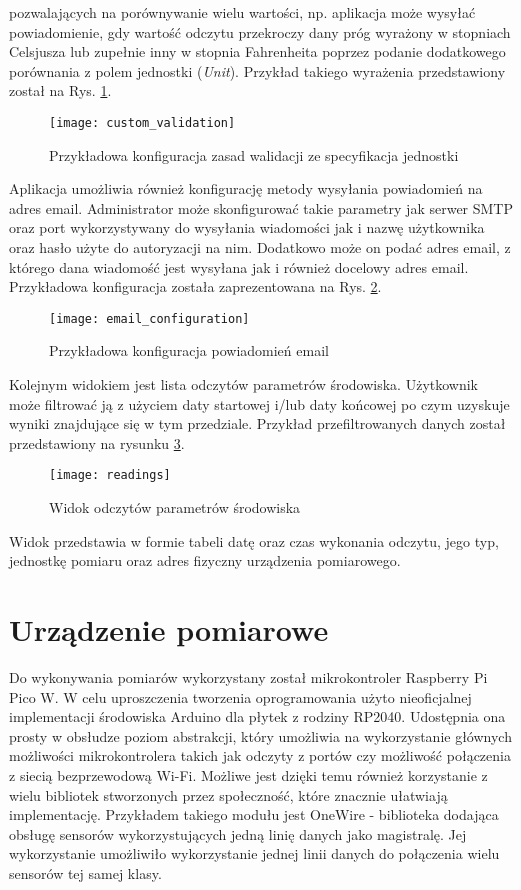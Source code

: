 pozwalających na porównywanie wielu wartości, np. aplikacja może wysyłać powiadomienie, gdy
wartość odczytu przekroczy dany próg wyrażony w stopniach Celsjusza lub zupełnie inny
w stopnia Fahrenheita poprzez podanie dodatkowego porównania z polem jednostki (\textit{Unit}).
Przykład takiego wyrażenia przedstawiony został na Rys. \ref{atmosphere:custom_validation}.
\begin{figure}[h!]
  \centering
  \texttt{[image: custom\_validation]}
  \caption{Przykładowa konfiguracja zasad walidacji ze specyfikacja jednostki}
  \label{atmosphere:custom_validation}
\end{figure}
Aplikacja umożliwia również konfigurację metody wysyłania powiadomień na adres email.
Administrator może skonfigurować takie parametry jak serwer SMTP oraz port wykorzystywany
do wysyłania wiadomości jak i nazwę użytkownika oraz hasło użyte do autoryzacji na nim.
Dodatkowo może on podać adres email, z którego dana wiadomość jest wysyłana jak i również
docelowy adres email. Przykładowa konfiguracja została zaprezentowana na Rys. \ref{atmosphere:email_configuration}.
\begin{figure}[h!]
  \centering
  \texttt{[image: email\_configuration]}
  \caption{Przykładowa konfiguracja powiadomień email}
  \label{atmosphere:email_configuration}
\end{figure}

Kolejnym widokiem jest lista odczytów parametrów środowiska. Użytkownik może 
filtrować ją z użyciem daty startowej i/lub daty końcowej po czym uzyskuje
wyniki znajdujące się w tym przedziale. Przykład przefiltrowanych danych
został przedstawiony na rysunku \ref{atmosphere:readings}.
\begin{figure}[h!]
  \centering
  \texttt{[image: readings]}
  \caption{Widok odczytów parametrów środowiska}
  \label{atmosphere:readings}
\end{figure}
Widok przedstawia w formie tabeli datę oraz czas wykonania odczytu, jego typ,
jednostkę pomiaru oraz adres fizyczny urządzenia pomiarowego.

\section{Urządzenie pomiarowe}
Do wykonywania pomiarów wykorzystany został mikrokontroler Raspberry Pi Pico W.
W celu uproszczenia tworzenia oprogramowania użyto nieoficjalnej implementacji
środowiska Arduino dla płytek z rodziny RP2040. Udostępnia ona prosty
w obsłudze poziom abstrakcji, który umożliwia na wykorzystanie głównych
możliwości mikrokontrolera takich jak odczyty z portów czy możliwość połączenia
z siecią bezprzewodową Wi-Fi. Możliwe jest dzięki temu również korzystanie z
wielu bibliotek stworzonych przez społeczność, które znacznie ułatwiają implementację.
Przykładem takiego modułu jest OneWire - biblioteka dodająca obsługę sensorów 
wykorzystujących jedną linię danych jako magistralę.
Jej wykorzystanie umożliwiło wykorzystanie jednej linii danych do połączenia wielu 
sensorów tej samej klasy.

